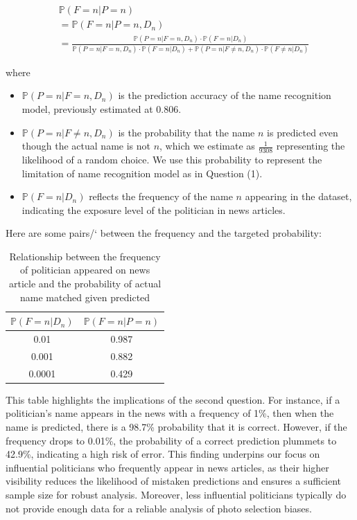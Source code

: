 \documentclass[sigconf]{acmart}
\newcommand{\Prob}[1]{\mathbb{P}\left(#1\right)}
\begin{document}
\begin{align*}
&\Prob{F = n | P = n} \\
&= \Prob{F = n | P = n, D_n} \\
&= \frac{\Prob{P = n | F = n, D_n} \cdot \Prob{F = n|D_n}}{\Prob{P = n | F = n, D_n} \cdot \Prob{F = n|D_n} + \Prob{P = n | F \neq n, D_n} \cdot \Prob{F \neq n|D_n}}
\end{align*}

where
\begin{itemize}
\item \( \Prob{P = n | F = n, D_n}\) is the prediction accuracy of the name recognition model, previously estimated at 0.806.
\item \( \Prob{P = n | F \neq n, D_n} \) is the probability that the name \( n \) is predicted even though the actual name is not \( n \), which we estimate as \( \frac{1}{9308} \) representing the likelihood of a random choice. We use this probability to represent the limitation of name recognition model as in Question (1).
\item \( \Prob{F = n|D_n} \) reflects the frequency of the name 
 \( n \) appearing in the dataset, indicating the exposure level of the politician in news articles.
\end{itemize}

Here are some pairs/‘ between the frequency and the targeted probability:

\begin{table}[H]  %
\centering  %
\begin{tabular}{|c|c|}
\hline
\( \Prob{F=n | D_n} \) & \( \Prob{F=n | P=n} \) \\
\hline
0.01 & 0.987 \\
0.001 & 0.882 \\
0.0001 & 0.429 \\
\hline
\end{tabular}
\caption{Relationship between the frequency of politician appeared on news article and the probability of actual name matched given predicted}
\label{tab:prob_estimates}
\end{table}
\vspace{-20pt}

This table highlights the implications of the second question. For instance, if a politician's name appears in the news with a frequency of 1\%, then when the name is predicted, there is a 98.7\% probability that it is correct. However, if the frequency drops to 0.01\%, the probability of a correct prediction plummets to 42.9\%, indicating a high risk of error. This finding underpins our focus on influential politicians who frequently appear in news articles, as their higher visibility reduces the likelihood of mistaken predictions and ensures a sufficient sample size for robust analysis. Moreover, less influential politicians typically do not provide enough data for a reliable analysis of photo selection biases.
\end{document}
